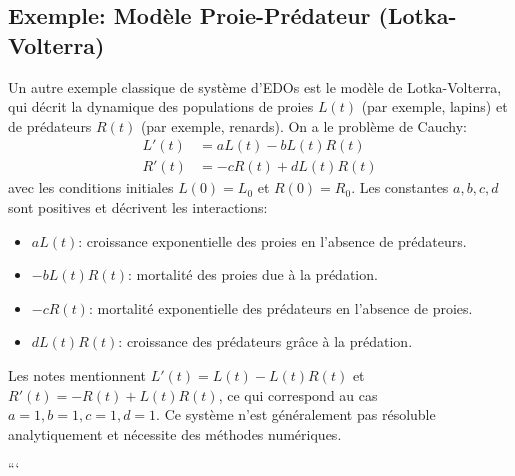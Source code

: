 \subsection{Exemple: Modèle Proie-Prédateur (Lotka-Volterra)}
\label{ssec:lotka_volterra}
Un autre exemple classique de système d'EDOs est le modèle de Lotka-Volterra, qui décrit la dynamique des populations de proies $L(t)$ (par exemple, lapins) et de prédateurs $R(t)$ (par exemple, renards).
On a le problème de Cauchy:
\begin{align*}
L'(t) &= a L(t) - b L(t)R(t) \\
R'(t) &= -c R(t) + d L(t)R(t)
\end{align*}
avec les conditions initiales $L(0) = L_0$ et $R(0) = R_0$. Les constantes $a,b,c,d$ sont positives et décrivent les interactions:
\begin{itemize}
    \item $a L(t)$: croissance exponentielle des proies en l'absence de prédateurs.
    \item $-b L(t)R(t)$: mortalité des proies due à la prédation.
    \item $-c R(t)$: mortalité exponentielle des prédateurs en l'absence de proies.
    \item $d L(t)R(t)$: croissance des prédateurs grâce à la prédation.
\end{itemize}
Les notes mentionnent $L'(t) = L(t) - L(t)R(t)$ et $R'(t) = -R(t) + L(t)R(t)$, ce qui correspond au cas $a=1, b=1, c=1, d=1$.
Ce système n'est généralement pas résoluble analytiquement et nécessite des méthodes numériques.


```